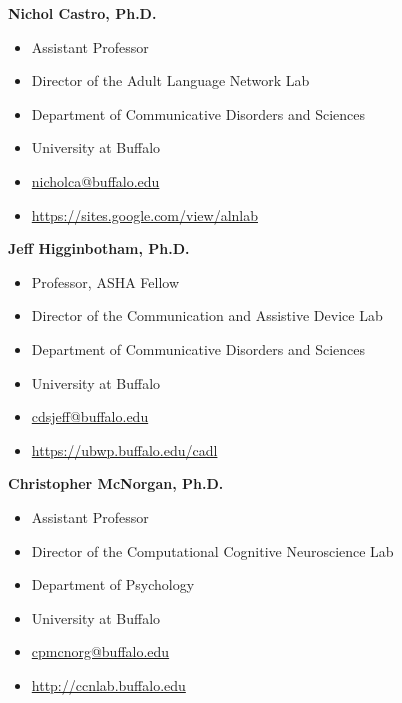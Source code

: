 \documentclass[11pt]{article}
\begin{document}
\textbf{Nichol Castro, Ph.D.}

\begin{itemize}[leftmargin=!,labelindent=!]
    \item[] Assistant Professor
    \item[] Director of the Adult Language Network Lab
    \item[] Department of Communicative Disorders and Sciences
    \item[] University at Buffalo
    \item[] \href{mailto:nicholca@buffalo.edu}{nicholca@buffalo.edu}
    \item[] \url{https://sites.google.com/view/alnlab}
\end{itemize}

\vspace{0.2cm}

\textbf{Jeff Higginbotham, Ph.D.}

\begin{itemize}[leftmargin=!,labelindent=!]
    \item[] Professor, ASHA Fellow
    \item[] Director of the Communication and Assistive Device Lab
    \item[] Department of Communicative Disorders and Sciences
    \item[] University at Buffalo
    \item[] \href{mailto:cdsjeff@buffalo.edu}{cdsjeff@buffalo.edu}
    \item[] \url{https://ubwp.buffalo.edu/cadl}
\end{itemize}

\vspace{0.2cm}

\textbf{Christopher McNorgan, Ph.D.}

\begin{itemize}[leftmargin=!,labelindent=!]
    \item[] Assistant Professor
    \item[] Director of the Computational Cognitive Neuroscience Lab
    \item[] Department of Psychology
    \item[] University at Buffalo
    \item[] \href{mailto:cpmcnorg@buffalo.edu}{cpmcnorg@buffalo.edu}
    \item[] \url{http://ccnlab.buffalo.edu}
\end{itemize}
\end{document}
